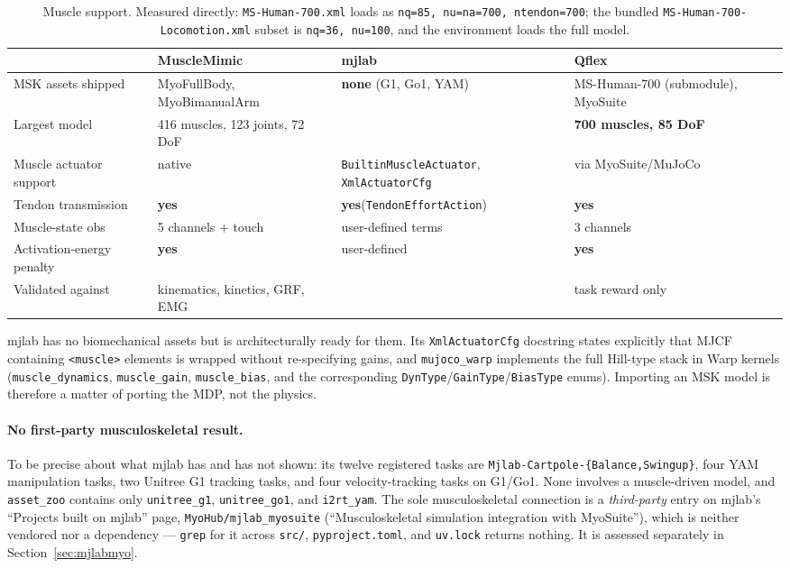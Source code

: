 \documentclass[11pt,a4paper]{article}
\newcommand{\yes}{\textbf{yes}}
\newcommand{\na}{\textemdash}
\begin{document}
\begin{table}[h!]
\centering
\footnotesize
\begin{tabular}{@{}lL{3.0cm}L{3.0cm}L{3.5cm}@{}}
\toprule
 & \textcolor{mmC}{MuscleMimic} & \textcolor{mjC}{mjlab} & \textcolor{qfC}{Qflex} \\
\midrule
MSK assets shipped & MyoFullBody, MyoBimanualArm & \textbf{none} (G1, Go1, YAM) & MS-Human-700 (submodule), MyoSuite \\
Largest model & 416 muscles, 123 joints, 72 DoF & \na & \textbf{700 muscles, 85 DoF} \\
Muscle actuator support & native & \texttt{BuiltinMuscleActuator}, \texttt{XmlActuatorCfg} & via MyoSuite/MuJoCo \\
Tendon transmission & \yes & \yes (\texttt{TendonEffortAction}) & \yes \\
Muscle-state obs & 5 channels + touch & user-defined terms & 3 channels \\
Activation-energy penalty & \yes & user-defined & \yes \\
Validated against & kinematics, kinetics, GRF, EMG & \na & task reward only \\
\bottomrule
\end{tabular}
\caption{Muscle support. Measured directly: \texttt{MS-Human-700.xml} loads as
\texttt{nq=85, nu=na=700, ntendon=700}; the bundled
\texttt{MS-Human-700-Locomotion.xml} subset is \texttt{nq=36, nu=100}, and the
environment loads the full model.}
\end{table}

\noindent
mjlab has no biomechanical assets but is architecturally ready for them. Its
\texttt{XmlActuatorCfg} docstring states explicitly that MJCF containing
\texttt{<muscle>} elements is wrapped without re-specifying gains, and
\texttt{mujoco\_warp} implements the full Hill-type stack in Warp kernels
(\texttt{muscle\_dynamics}, \texttt{muscle\_gain}, \texttt{muscle\_bias}, and the
corresponding \texttt{DynType}/\texttt{GainType}/\texttt{BiasType} enums). Importing an
MSK model is therefore a matter of porting the MDP, not the physics.

\paragraph{No first-party musculoskeletal result.} To be precise about what mjlab has and
has not shown: its twelve registered tasks are \texttt{Mjlab-Cartpole-\{Balance,Swingup\}},
four YAM manipulation tasks, two Unitree G1 tracking tasks, and four velocity-tracking
tasks on G1/Go1. None involves a muscle-driven model, and \texttt{asset\_zoo} contains only
\texttt{unitree\_g1}, \texttt{unitree\_go1}, and \texttt{i2rt\_yam}. The sole musculoskeletal
connection is a \emph{third-party} entry on mjlab's ``Projects built on mjlab'' page,
\texttt{MyoHub/mjlab\_myosuite} (``Musculoskeletal simulation integration with MyoSuite''),
which is neither vendored nor a dependency --- \texttt{grep} for it across \texttt{src/},
\texttt{pyproject.toml}, and \texttt{uv.lock} returns nothing. It is assessed separately in
Section~\ref{sec:mjlabmyo}.
\end{document}
